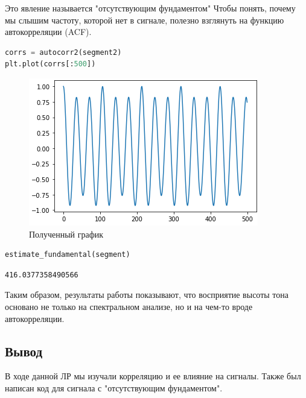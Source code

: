 Это явление называется "отсутствующим фундаментом"
Чтобы понять, почему мы слышим частоту, которой нет в сигнале, полезно взглянуть на функцию автокорреляции (ACF).

\begin{lstlisting}[language=Python]
corrs = autocorr2(segment2)
plt.plot(corrs[:500])
\end{lstlisting}

\begin{figure}[H]
	\begin{center}
		\includegraphics[scale=1]{fig/lab05/lab5_11.png}
		\caption{Полученный график}
	\end{center}
\end{figure}

\begin{lstlisting}[language=Python]
estimate_fundamental(segment)
\end{lstlisting}

\begin{lstlisting}
416.0377358490566
\end{lstlisting}

Таким образом, результаты работы показывают, что восприятие высоты тона основано не только на спектральном анализе, но и на чем-то вроде автокорреляции.

\subsection{Вывод}

В ходе данной ЛР мы изучали корреляцию и ее влияние на сигналы. Также был написан код для сигнала с "отсутствующим фундаментом".


